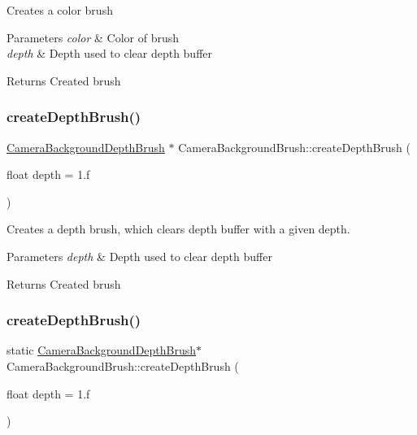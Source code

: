 Creates a color brush 
\begin{DoxyParams}{Parameters}
{\em color} & Color of brush \\
\hline
{\em depth} & Depth used to clear depth buffer \\
\hline
\end{DoxyParams}
\begin{DoxyReturn}{Returns}
Created brush 
\end{DoxyReturn}
\mbox{\label{classCameraBackgroundBrush_a32d485ee8c53bba234ca90c3db962fac}} 
\subsubsection{\texorpdfstring{create\+Depth\+Brush()}{createDepthBrush()}\hspace{0.1cm}{\footnotesize\ttfamily [1/2]}}
{\footnotesize\ttfamily \hyperlink{classCameraBackgroundDepthBrush}{Camera\+Background\+Depth\+Brush} $\ast$ Camera\+Background\+Brush\+::create\+Depth\+Brush (\begin{DoxyParamCaption}\item[{float}]{depth = {\ttfamily 1.f} }\end{DoxyParamCaption})\hspace{0.3cm}{\ttfamily [static]}}

Creates a depth brush, which clears depth buffer with a given depth. 
\begin{DoxyParams}{Parameters}
{\em depth} & Depth used to clear depth buffer \\
\hline
\end{DoxyParams}
\begin{DoxyReturn}{Returns}
Created brush 
\end{DoxyReturn}
\mbox{\label{classCameraBackgroundBrush_a79976e5b33d8880be95fac9376ed4b69}} 
\subsubsection{\texorpdfstring{create\+Depth\+Brush()}{createDepthBrush()}\hspace{0.1cm}{\footnotesize\ttfamily [2/2]}}
{\footnotesize\ttfamily static \hyperlink{classCameraBackgroundDepthBrush}{Camera\+Background\+Depth\+Brush}$\ast$ Camera\+Background\+Brush\+::create\+Depth\+Brush (\begin{DoxyParamCaption}\item[{float}]{depth = {\ttfamily 1.f} }\end{DoxyParamCaption})\hspace{0.3cm}{\ttfamily [static]}}


